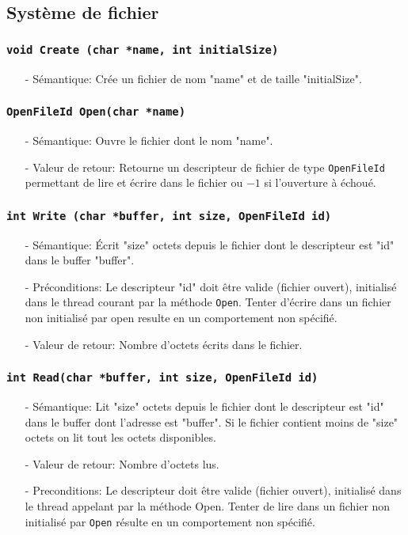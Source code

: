 \documentclass[11pt]{article}
\theoremstyle{definition}
\theoremstyle{definition}
\begin{document}
\subsection{Système de fichier}

\subsubsection{\texttt{void Create (char *name, int initialSize)}}
\begin{itemize}
\item[-]Sémantique: Crée un fichier de nom "name" et de taille "initialSize".
\end{itemize}

\subsubsection{\texttt{OpenFileId Open(char *name)}}
\begin{itemize}
\item[-]Sémantique: Ouvre le fichier dont le nom "name". 
\item[-]Valeur de retour: Retourne un descripteur de fichier de type \texttt{OpenFileId}
  permettant de lire et écrire dans le fichier ou $-1$ si l'ouverture à échoué.
\end{itemize}

\subsubsection{\texttt{int Write (char *buffer, int size, OpenFileId id)}}
\begin{itemize}
\item[-]Sémantique: Écrit "size" octets depuis le fichier dont le descripteur est "id"
  dans le buffer "buffer".
\item[-]Préconditions: Le descripteur "id" doit être valide (fichier ouvert), initialisé dans le thread courant
  par la méthode \texttt{Open}. Tenter d'écrire dans un fichier non initialisé par open resulte en un comportement non spécifié.
\item[-]Valeur de retour: Nombre d'octets écrits dans le fichier.
\end{itemize}

\subsubsection{\texttt{int Read(char *buffer, int size, OpenFileId id)}}
\begin{itemize}
\item[-]Sémantique: Lit "size" octets depuis le fichier dont le descripteur est "id" dans le buffer
  dont l'adresse est "buffer". Si le fichier contient moins de "size" octets on lit tout les octets disponibles.
\item[-]Valeur de retour: Nombre d'octets lus.
\item[-]Preconditions: Le descripteur doit être valide (fichier ouvert), initialisé dans le thread appelant
  par la méthode Open.
  Tenter de lire dans un fichier non initialisé par \texttt{Open} résulte en un comportement non spécifié.
\end{itemize}
\end{document}

